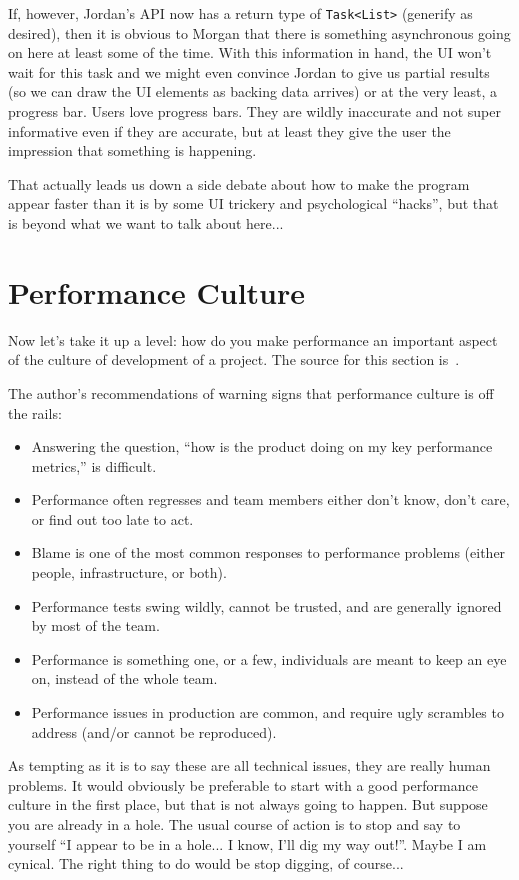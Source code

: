 If, however, Jordan's API now has a return type of \texttt{Task<List>} (generify as desired), then it is obvious to Morgan that there is something asynchronous going on here at least some of the time. With this information in hand, the UI won't wait for this task and we might even convince Jordan to give us partial results (so we can draw the UI elements as backing data arrives) or at the very least, a progress bar. Users love progress bars. They are wildly inaccurate and not super informative even if they are accurate, but at least they give the user the impression that something is happening.

That actually leads us down a side debate about how to make the program appear faster than it is by some UI trickery and psychological ``hacks'', but that is beyond what we want to talk about here...

\section*{Performance Culture}

Now let's take it up a level: how do you make performance an important aspect of the culture of development of a project. The source for this section is~\cite{perfculture}.

The author's recommendations of warning signs that performance culture is off the rails:

\begin{itemize}
\item Answering the question, ``how is the product doing on my key performance metrics,'' is difficult.
\item Performance often regresses and team members either don't know, don't care, or find out too late to act.
\item Blame is one of the most common responses to performance problems (either people, infrastructure, or both).
\item Performance tests swing wildly, cannot be trusted, and are generally ignored by most of the team.
\item Performance is something one, or a few, individuals are meant to keep an eye on, instead of the whole team.
\item Performance issues in production are common, and require ugly scrambles to address (and/or cannot be reproduced).
\end{itemize}

As tempting as it is to say these are all technical issues, they are really human problems. It would obviously be preferable to start with a good performance culture in the first place, but that is not always going to happen. But suppose you are already in a hole. The usual course of action is to stop and say to yourself ``I appear to be in a hole... I know, I'll dig my way out!''. Maybe I am cynical. The right thing to do would be stop digging, of course...

